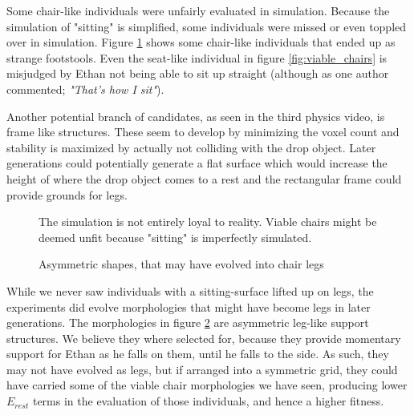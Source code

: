 Some chair-like individuals were unfairly evaluated in simulation. Because the
simulation of "sitting" is simplified, some individuals were missed or even
toppled over in simulation. Figure \ref{fig:footstools} shows some chair-like
individuals that ended up as strange footstools. Even the seat-like individual
in figure \ref{fig:viable_chairs} is misjudged by Ethan not being able to sit up
straight (although as one author commented; \emph{"That's how I sit"}).

Another potential branch of candidates, as seen in the third physics video\cite{vid:video3}, is frame like structures.
These seem to develop by minimizing the voxel count and stability is maximized by actually not colliding with the drop object.
Later generations could potentially generate a flat surface which would increase the height of 
where the drop object comes to a rest and the rectangular frame could provide grounds for legs. 

\begin{figure}[ht]
	\centering
	 \hfil
	\caption{The simulation is not entirely loyal to reality. Viable chairs
	might be deemed unfit because "sitting" is imperfectly simulated.}
	\label{fig:footstools}
\end{figure}

\begin{figure}[h]
\centering
{}
\hfil
{}
\caption{Asymmetric shapes, that may have evolved into chair legs}
\label{fig:chair_legs}
\end{figure}

While we never saw individuals with a sitting-surface lifted up on legs, the
experiments did evolve morphologies that might have become legs in later
generations. The morphologies in figure \ref{fig:chair_legs} are asymmetric
leg-like support structures. We believe they where selected for, because they
provide momentary support for Ethan as he falls on them, until he falls to the
side. As such, they may not have evolved as legs, but if arranged into a
symmetric grid, they could have carried some of the viable chair morphologies we
have seen, producing lower $E_{rest}$ terms in the evaluation of those
individuals, and hence a higher fitness.
